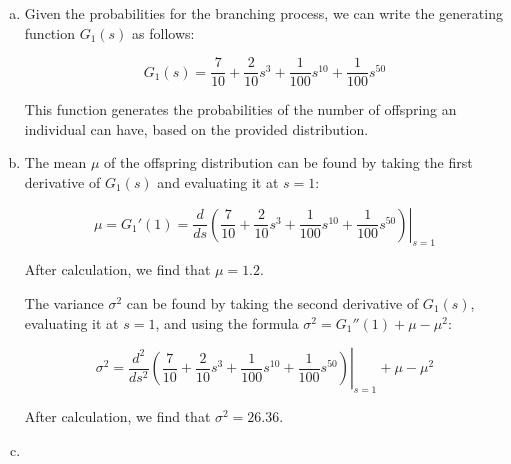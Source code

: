 \begin{solution}
	\begin{enumerate}[(a)]
		\item Given the probabilities for the branching process, we can write the generating function \( G_1(s) \) as follows:
		
		\[ G_1(s) = \frac{7}{10} + \frac{2}{10} s^3 + \frac{1}{100} s^{10} + \frac{1}{100} s^{50} \]
		
		This function generates the probabilities of the number of offspring an individual can have, based on the provided distribution.
		
		
		\item The mean \( \mu \) of the offspring distribution can be found by taking the first derivative of \( G_1(s) \) and evaluating it at \( s = 1 \):
		
		\[ \mu = G_1'(1) = \left. \frac{d}{ds} \left(\frac{7}{10} + \frac{2}{10} s^3 + \frac{1}{100} s^{10} + \frac{1}{100} s^{50}\right) \right|_{s=1} \]
		
		After calculation, we find that \( \mu = 1.2 \).
		
		The variance \( \sigma^2 \) can be found by taking the second derivative of \( G_1(s) \), evaluating it at \( s = 1 \), and using the formula \( \sigma^2 = G_1''(1) + \mu - \mu^2 \):
		
		\[ \sigma^2 = \left. \frac{d^2}{ds^2} \left(\frac{7}{10} + \frac{2}{10} s^3 + \frac{1}{100} s^{10} + \frac{1}{100} s^{50}\right) \right|_{s=1} + \mu - \mu^2 \]
		
		After calculation, we find that \( \sigma^2 = 26.36 \).
		
		
		\item 
	\end{enumerate}
\end{solution}









\newpage
